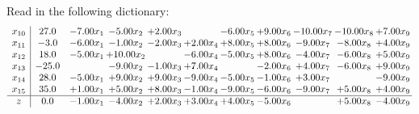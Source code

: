 \documentclass[9pt]{article}
\begin{document}
Read in the following dictionary:
\[\begin{array}{c| c c@{\hskip 2pt} c@{\hskip 2pt} c@{\hskip 2pt} c@{\hskip 2pt} c@{\hskip 2pt} c@{\hskip 2pt} c@{\hskip 2pt} c@{\hskip 2pt} c@{\hskip 2pt} }
 x_{10}   &  27.0 & -7.00 x_{1} & -5.00 x_{2} & +  2.00 x_{3} &   & -6.00 x_{5} & +  9.00 x_{6} & -10.00 x_{7} & -10.00 x_{8} & +  7.00 x_{9}\\
 x_{11}   &  -3.0 & -6.00 x_{1} & -1.00 x_{2} & -2.00 x_{3} & +  2.00 x_{4} & +  8.00 x_{5} & +  8.00 x_{6} & -9.00 x_{7} & -8.00 x_{8} & +  4.00 x_{9}\\
 x_{12}   &  18.0 & -5.00 x_{1} & + 10.00 x_{2} &   & -6.00 x_{4} & -5.00 x_{5} & +  8.00 x_{6} & -4.00 x_{7} & -6.00 x_{8} & +  5.00 x_{9}\\
 x_{13}   &  -25.0  &   & -9.00 x_{2} & -1.00 x_{3} & +  7.00 x_{4} &   & -2.00 x_{6} & +  4.00 x_{7} & -6.00 x_{8} & +  9.00 x_{9}\\
 x_{14}   &  28.0 & -5.00 x_{1} & +  9.00 x_{2} & +  9.00 x_{3} & -9.00 x_{4} & -5.00 x_{5} & -1.00 x_{6} & +  3.00 x_{7} &   & -9.00 x_{9}\\
 x_{15}   &  35.0 & +  1.00 x_{1} & +  5.00 x_{2} & +  8.00 x_{3} & -1.00 x_{4} & -9.00 x_{5} & -6.00 x_{6} & -9.00 x_{7} & +  5.00 x_{8} & +  4.00 x_{9}\\
\hline
z    &  0.0 & -1.00 x_{1} & -4.00 x_{2} & +  2.00 x_{3} & +  3.00 x_{4} & +  4.00 x_{5} & -5.00 x_{6} &   & +  5.00 x_{8} & -4.00 x_{9}\\
\end{array}\]
\end{document}

